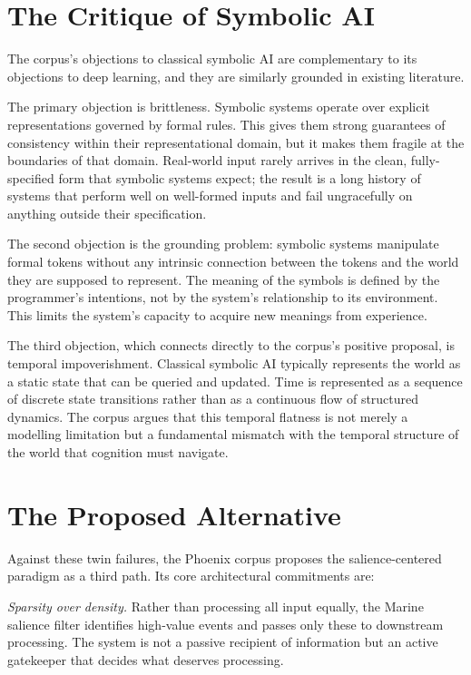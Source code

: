 \section{The Critique of Symbolic AI}
\label{sec:critique-symbolic}

The corpus's objections to classical symbolic AI are
complementary to its objections to deep learning, and
they are similarly grounded in existing literature.

The primary objection is brittleness. Symbolic systems
operate over explicit representations governed by formal
rules. This gives them strong guarantees of consistency
within their representational domain, but it makes them
fragile at the boundaries of that domain. Real-world input
rarely arrives in the clean, fully-specified form that
symbolic systems expect; the result is a long history of
systems that perform well on well-formed inputs and fail
ungracefully on anything outside their specification.

The second objection is the grounding problem: symbolic
systems manipulate formal tokens without any intrinsic
connection between the tokens and the world they are
supposed to represent. The meaning of the symbols is
defined by the programmer's intentions, not by the
system's relationship to its environment. This limits
the system's capacity to acquire new meanings from experience.

The third objection, which connects directly to the
corpus's positive proposal, is temporal impoverishment.
Classical symbolic AI typically represents the world
as a static state that can be queried and updated. Time
is represented as a sequence of discrete state transitions
rather than as a continuous flow of structured dynamics.
The corpus argues that this temporal flatness is not
merely a modelling limitation but a fundamental mismatch
with the temporal structure of the world that cognition
must navigate.

\section{The Proposed Alternative}
\label{sec:proposed-alternative}

Against these twin failures, the Phoenix corpus proposes
the salience-centered paradigm as a third path. Its
core architectural commitments are:

\textit{Sparsity over density.} Rather than processing all
input equally, the Marine salience filter identifies high-value
events and passes only these to downstream processing. The
system is not a passive recipient of information but an
active gatekeeper that decides what deserves processing.

